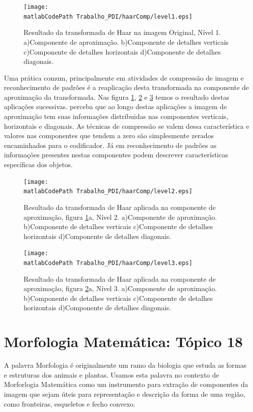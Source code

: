 \documentclass[
	article,			%
	11pt,				%
	oneside,			%
	a4paper,			%
	english,			%
	brazil,				%
	sumario=tradicional
	]{abntex2}
\newcommand{\matlabCodePath}{/home/clifte/git/Mestrado/Matlab/}
\begin{document}
\begin{figure} 
		\centering 
		\texttt{[image: \\matlabCodePath
		Trabalho\_PDI/haarComp/level1.eps]}
		\caption{Resultado da transformada de Haar na imagem Original, Nível 1.
		a)Componente de aproximação.
		b)Componente de detalhes verticais
		c)Componente de detalhes horizontais
		d)Componente de detalhes diagonais.
		}
		\label{fig:haarDec1}		
\end{figure}
Uma prática comum, principalmente em atividades de compressão de imagem e
reconhecimento de padrões é a reaplicação desta transformada na componente de
aproximação da transformada. Nas figura
\ref{fig:haarDec1}, \ref{fig:haarDec2} e \ref{fig:haarDec3} temos o resultado
destas aplicações sucessivas. perceba que ao longo destas aplicações a imagem de
aproximação tem suas informações distribuidas nas componentes verticais,
horizontais e diagonais. As técnicas de compressão se valem dessa característica
e valores nas componentes que tendem a zero são simplesmente zerados
encaminhados para o codificador. Já em reconhecimento de padrões as informações
presentes nestas componentes podem descrever características específicas dos
objetos.

\begin{figure} 
		\centering 
		\texttt{[image: \\matlabCodePath
		Trabalho\_PDI/haarComp/level2.eps]}
		\caption{Resultado da transformada de Haar aplicada na componente de
		aproximação, figura \ref{fig:haarDec1}a, Nível 2.
		a)Componente de aproximação.
		b)Componente de detalhes verticais
		c)Componente de detalhes horizontais
		d)Componente de detalhes diagonais.
		}
		\label{fig:haarDec2}		
\end{figure}


\begin{figure} 
		\centering 
		\texttt{[image: \\matlabCodePath
		Trabalho\_PDI/haarComp/level3.eps]}
		\caption{Resultado da transformada de Haar aplicada na componente de
		aproximação, figura \ref{fig:haarDec2}a, Nível 3.
		a)Componente de aproximação.
		b)Componente de detalhes verticais
		c)Componente de detalhes horizontais
		d)Componente de detalhes diagonais.
		}
		\label{fig:haarDec3}		
\end{figure}


\section{Morfologia Matemática: Tópico 18}
A palavra Morfologia é originalmente um ramo da biologia que estuda as
formas e estruturas dos animais e plantas. Usamos esta palavra no contexto de
Morforlogia Matemática como um instrumento para extração de componentes
da imagem que sejam úteis para representação e descrição da forma de uma
região, como fronteiras, esqueletos e fecho convexo.
\end{document}
